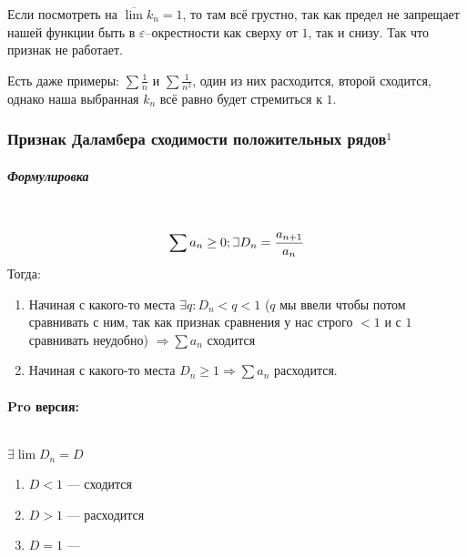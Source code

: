 \documentclass{article}
\def\letus{%
\mathord{\setbox0=\hbox{$\exists$}%
         \hbox{\kern 0.125\wd0%
               \vbox to \ht0{%
                  \hrule width 0.75\wd0%
                  \vfill%
                  \hrule width 0.75\wd0}%
               \vrule height \ht0%
               \kern 0.125\wd0}%
       }%
        }
\let\vanillaparagraph\paragraph
\let\vanillasubparagraph\subparagraph
\renewcommand{\paragraph}[1]{\vanillaparagraph{#1}\mbox{}\\}
\renewcommand{\subparagraph}[1]{\vanillasubparagraph{#1}\mbox{}\\}
\begin{document}
Если посмотреть на $\overline{\lim} k_n = 1$, то там всё грустно, так как предел не запрещает нашей функции быть в $\varepsilon$--окрестности как сверху от $1$, так и снизу. Так что признак не работает. 

Есть даже примеры: $\sum \frac{1}{n}$ и $\sum \frac{1}{n^2}$, один из них расходится, второй сходится, однако наша выбранная $k_n$ всё равно будет стремиться к $1$.


\subsubsection{Признак Даламбера сходимости положительных рядов\texorpdfstring{$^1$}{}}
\subparagraph{Формулировка}
$$
\sum a_n \ge 0; \letus D_n = \frac{a_{n+1}}{a_n}
$$
Тогда:
\begin{enumerate}
    \item Начиная с какого-то места $\exists q : D_n < q < 1$ ($q$ мы ввели чтобы потом сравнивать с ним, так как признак сравнения у нас строго $<1$ и с $1$ сравнивать неудобно) $\Rightarrow \sum a_n$ сходится
    \item Начиная с какого-то места $D_n \ge 1 \Rightarrow \sum a_n$ расходится.
\end{enumerate}
\paragraph{Pro версия:}
$\exists \lim D_n = D$
\begin{enumerate}
    \item $D < 1$ --- сходится
    \item $D > 1$ --- расходится
    \item $D = 1$ --- \Frowny
\end{enumerate}
\end{document}
